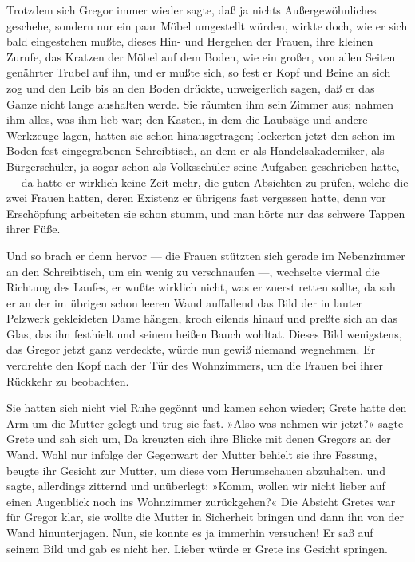 Trotzdem sich Gregor immer wieder sagte, daß ja nichts Außergewöhnliches
geschehe, sondern nur ein paar Möbel umgestellt würden, wirkte doch, wie
er sich bald eingestehen mußte, dieses Hin- und Hergehen der Frauen,
ihre kleinen Zurufe, das Kratzen der Möbel auf dem Boden, wie ein
großer, von allen Seiten genährter Trubel auf ihn, und er mußte sich, so
fest er Kopf und Beine an sich zog und den Leib bis an den Boden
drückte, unweigerlich sagen, daß er das Ganze nicht lange aushalten
werde. Sie räumten ihm sein Zimmer aus; nahmen ihm alles, was ihm lieb
war; den Kasten, in dem die Laubsäge und andere Werkzeuge lagen, hatten
sie schon hinausgetragen; lockerten jetzt den schon im Boden fest
eingegrabenen Schreibtisch, an dem er als Handelsakademiker, als
Bürgerschüler, ja sogar schon als Volksschüler seine Aufgaben
geschrieben hatte, --- da hatte er wirklich keine Zeit mehr, die guten
Absichten zu prüfen, welche die zwei Frauen hatten, deren Existenz er
übrigens fast vergessen hatte, denn vor Erschöpfung arbeiteten sie schon
stumm, und man hörte nur das schwere Tappen ihrer Füße.

Und so brach er denn hervor --- die Frauen stützten sich gerade im
Nebenzimmer an den Schreibtisch, um ein wenig zu verschnaufen ---,
wechselte viermal die Richtung des Laufes, er wußte wirklich nicht, was
er zuerst retten sollte, da sah er an der im übrigen schon leeren Wand
auffallend das Bild der in lauter Pelzwerk gekleideten Dame hängen,
kroch eilends hinauf und preßte sich an das Glas, das ihn festhielt und
seinem heißen Bauch wohltat. Dieses Bild wenigstens, das Gregor jetzt
ganz verdeckte, würde nun gewiß niemand wegnehmen. Er verdrehte den Kopf
nach der Tür des Wohnzimmers, um die Frauen bei ihrer Rückkehr zu
beobachten.

Sie hatten sich nicht viel Ruhe gegönnt und kamen schon wieder; Grete
hatte den Arm um die Mutter gelegt und trug sie fast. »Also was nehmen
wir jetzt?« sagte Grete und sah sich um, Da kreuzten sich ihre Blicke
mit denen Gregors an der Wand. Wohl nur infolge der Gegenwart der Mutter
behielt sie ihre Fassung, beugte ihr Gesicht zur Mutter, um diese vom
Herumschauen abzuhalten, und sagte, allerdings zitternd und unüberlegt:
»Komm, wollen wir nicht lieber auf einen Augenblick noch ins Wohnzimmer
zurückgehen?« Die Absicht Gretes war für Gregor klar, sie wollte die
Mutter in Sicherheit bringen und dann ihn von der Wand hinunterjagen.
Nun, sie konnte es ja immerhin versuchen! Er saß auf seinem Bild und
gab es nicht her. Lieber würde er Grete ins Gesicht springen.

